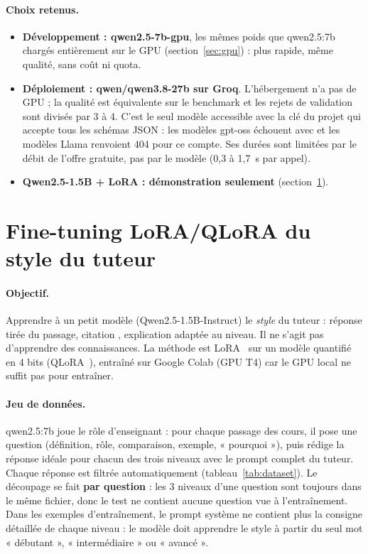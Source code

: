 \documentclass[12pt,a4paper]{report}
\DeclareRobustCommand{\code}[1]{\texttt{\codecasse{#1}}}
\begin{document}
\paragraph{Choix retenus.}
\begin{itemize}
  \item \textbf{Développement : qwen2.5-7b-gpu}, les mêmes poids que qwen2.5:7b chargés entièrement sur
        le GPU (section~\ref{sec:gpu}) : plus rapide, même qualité, sans coût ni quota.
  \item \textbf{Déploiement : qwen/qwen3.8-27b sur Groq}. L'hébergement n'a pas de GPU ; la qualité est
        équivalente sur le benchmark et les rejets de validation sont divisés par 3 à 4. C'est le seul
        modèle accessible avec la clé du projet qui accepte tous les schémas JSON : les modèles gpt-oss
        échouent avec \code{json_validate_failed} et les modèles Llama renvoient 404 pour ce compte. Ses
        durées sont limitées par le débit de l'offre gratuite, pas par le modèle (0,3 à 1,7~s par appel).
  \item \textbf{Qwen2.5-1.5B + LoRA : démonstration seulement} (section~\ref{sec:lora}).
\end{itemize}

\section{Fine-tuning LoRA/QLoRA du style du tuteur}
\label{sec:lora}

\paragraph{Objectif.} Apprendre à un petit modèle (Qwen2.5-1.5B-Instruct) le \emph{style} du tuteur :
réponse tirée du passage, citation \code{[p.X]}, explication adaptée au niveau. Il ne s'agit pas
d'apprendre des connaissances. La méthode est LoRA~\cite{hu2022lora} sur un modèle quantifié en
4 bits (QLoRA~\cite{dettmers2023qlora}), entraîné sur Google Colab (GPU T4) car le GPU local ne suffit
pas pour entraîner.

\paragraph{Jeu de données.} qwen2.5:7b joue le rôle d'enseignant : pour chaque passage des cours, il pose
une question (définition, rôle, comparaison, exemple, « pourquoi »), puis rédige la réponse idéale pour
chacun des trois niveaux avec le prompt complet du tuteur. Chaque réponse est filtrée automatiquement
(tableau~\ref{tab:dataset}). Le découpage se fait \textbf{par question} : les 3 niveaux d'une question sont
toujours dans le même fichier, donc le test ne contient aucune question vue à l'entraînement. Dans les
exemples d'entraînement, le prompt système ne contient plus la consigne détaillée de chaque niveau : le
modèle doit apprendre le style à partir du seul mot « débutant », « intermédiaire » ou « avancé ».
\end{document}
